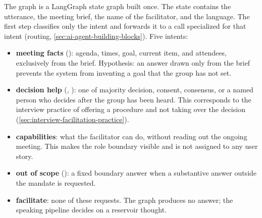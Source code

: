 The graph is a LangGraph state graph built once.
The state contains the utterance, the meeting brief, the name of the facilitator, and the language.
The first step classifies only the intent and forwards it to a call specialized for that intent
(routing, \autoref{sec:ai-agent-building-blocks}).
Five intents:
\begin{itemize}
  \item \textbf{meeting facts} (): agenda, times, goal, current item, and
    attendees, exclusively from the brief.
    Hypothesis: an answer drawn only from the brief prevents the system from inventing a goal that the group
    has not set.
  \item \textbf{decision help} (, ): one of majority decision,
    consent, consensus, or a named person who decides after the group has been heard.
    This corresponds to the interview practice of offering a procedure and not taking over the decision
    (\autoref{sec:interview-facilitation-practice}).
  \item \textbf{capabilities}: what the facilitator can do, without reading out the ongoing meeting.
    This makes the role boundary visible and is not assigned to any user story.
  \item \textbf{out of scope} (): a fixed boundary answer when a substantive answer
    outside the mandate is requested.
  \item \textbf{facilitate}: none of these requests.
    The graph produces no answer; the speaking pipeline decides on a reservoir thought.
\end{itemize}

